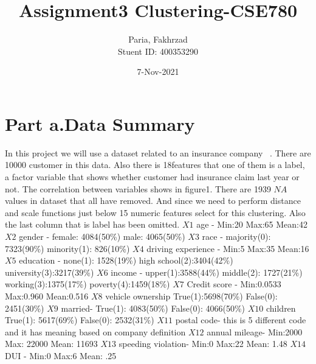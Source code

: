\documentclass[a4paper, 11pt]{article}
\title{Assignment3 Clustering-CSE780}
\author{Paria, Fakhrzad \\ Stuent ID: 400353290 }
\date{7-Nov-2021}
\begin{document}
	
	\maketitle
	\newpage
\section*{Part a.Data Summary}
In this project we will use a dataset related to an insurance company ~\cite{data}. There are 10000 customer in this data. Also there is 18features that one of them is a label, a factor variable that shows whether customer had insurance claim last year or not. The correlation between variables shows in figure1.\newline
There are 1939 $NA$ values in dataset that all have removed. And since we need to perform distance and scale functions just below 15 numeric features select for this clustering. Also the last column that is label has been omitted.\newline
$X1$ age    -            Min:20  Max:65  Mean:42 \newline
$X2$ gender -            female: 4084(50\%)   male: 4065(50\%) \newline
$X3$ race   - majority(0): 7323(90\%)  minority(1): 826(10\%)\newline
$X4$ driving experience - Min:5   Max:35   Mean:16 \newline
$X5$ education - none(1): 1528(19\%)   high school(2):3404(42\%)  university(3):3217(39\%)\newline
$X6$ income - upper(1):3588(44\%) middle(2): 1727(21\%) working(3):1375(17\%) poverty(4):1459(18\%) \newline
$X7$ Credit score -     Min:0.0533   Max:0.960  Mean:0.516 \newline
$X8$ vehicle ownership  True(1):5698(70\%)   False(0): 2451(30\%) \newline
$X9$ married-           True(1): 4083(50\%)  False(0): 4066(50\%) \newline
$X10$ children          True(1): 5617(69\%)  False(0): 2532(31\%) \newline
$X11$ postal code- this is 5 different code and it has meaning based on company definition\newline
$X12$ annual mileage-     Min:2000    Max: 22000   Mean: 11693 \newline
$X13$ speeding violation- Min:0       Max:22       Mean: 1.48  \newline
$X14$ DUI -               Min:0       Max:6        Mean: .25 \newline
\end{document}
